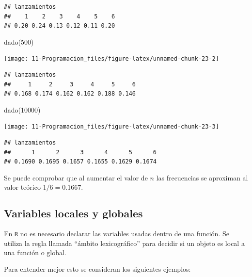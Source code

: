 \documentclass[
]{book}
\newenvironment{Shaded}{\begin{snugshade}}{\end{snugshade}}
\newcommand{\DecValTok}[1]{\textcolor[rgb]{0.00,0.00,0.81}{#1}}
\newcommand{\FunctionTok}[1]{\textcolor[rgb]{0.00,0.00,0.00}{#1}}
\newcommand{\NormalTok}[1]{#1}
\theoremstyle{break}
\theoremstyle{nonumberplain}
\begin{document}
\begin{verbatim}
## lanzamientos
##    1    2    3    4    5    6 
## 0.20 0.24 0.13 0.12 0.11 0.20
\end{verbatim}

\begin{Shaded}
\begin{Highlighting}[]
\FunctionTok{dado}\NormalTok{(}\DecValTok{500}\NormalTok{)}
\end{Highlighting}
\end{Shaded}

\begin{center}\texttt{[image: 11-Programacion\_files/figure-latex/unnamed-chunk-23-2]} \end{center}

\begin{verbatim}
## lanzamientos
##     1     2     3     4     5     6 
## 0.168 0.174 0.162 0.162 0.188 0.146
\end{verbatim}

\begin{Shaded}
\begin{Highlighting}[]
\FunctionTok{dado}\NormalTok{(}\DecValTok{10000}\NormalTok{)}
\end{Highlighting}
\end{Shaded}

\begin{center}\texttt{[image: 11-Programacion\_files/figure-latex/unnamed-chunk-23-3]} \end{center}

\begin{verbatim}
## lanzamientos
##      1      2      3      4      5      6 
## 0.1690 0.1695 0.1657 0.1655 0.1629 0.1674
\end{verbatim}

Se puede comprobar que al aumentar el valor de \(n\) las frecuencias se
aproximan al valor teórico \(1/6=0.1667\).

\hypertarget{variables-locales-y-globales}{%
\subsection{Variables locales y globales}\label{variables-locales-y-globales}}

En \texttt{R} no es
necesario declarar las variables usadas dentro de una función. Se
utiliza la regla llamada ``ámbito lexicográfico'' para decidir si un
objeto es local a una función o global.

Para entender mejor esto se consideran los siguientes ejemplos:
\end{document}
